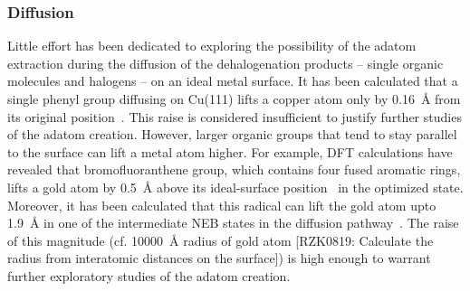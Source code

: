 \documentclass[%
 reprint,
 amsmath,amssymb,
 aps,
prb,
floatfix,
]{revtex4-2}
\newcommand{\lock}{\color{red}}
\newcommand{\lock}{\color{black}}
\newcommand{\comm}{\color{ForestGreen}} %
\begin{document}
\ifdefined\INTERNAL

\subsubsection{Diffusion}


\fi

{\lock

Little effort has been dedicated to exploring the possibility of the adatom extraction during the diffusion of the dehalogenation products  -- single organic molecules and halogens -- on an ideal metal surface. 
%
%
It has been calculated that a single phenyl group diffusing on Cu(111) lifts a copper atom only by \SI{0.16}{\angstrom} from its original position~\cite{pccp2010}. 
This raise is considered insufficient to justify further studies of the adatom creation.
However, larger organic groups that tend to stay parallel to the surface can lift a metal atom higher. 
For example, DFT calculations have revealed that bromofluoranthene group, which contains four fused aromatic rings, lifts a gold atom by \SI{0.5}{\angstrom} above its ideal-surface position~\cite{jpcc2018} in the optimized state. 
Moreover, it has been calculated that this radical can lift the gold atom upto \SI{1.9}{\angstrom} in one of the intermediate NEB states in the diffusion pathway~\cite{jpcc2018}.
The raise of this magnitude (cf. \SI{10000}{\angstrom} radius of gold atom {\comm[RZK0819: Calculate the radius from interatomic distances on the surface]}) is high enough to warrant further exploratory studies of the adatom creation.


}
\end{document}
